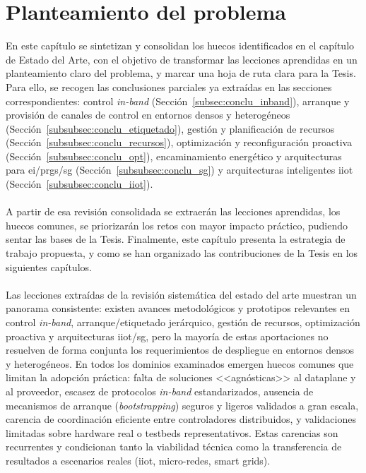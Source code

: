 \chapter{Planteamiento del problema}
\label{ch:problema}

En este capítulo se sintetizan y consolidan los huecos identificados en el capítulo de Estado del Arte, con el objetivo de transformar las lecciones aprendidas en un planteamiento claro del problema, y marcar una hoja de ruta clara para la Tesis. Para ello, se recogen las conclusiones parciales ya extraídas en las secciones correspondientes: control \textit{in-band} (Sección~\ref{subsec:conclu_inband}), arranque y provisión de canales de control en entornos densos y heterogéneos (Sección~\ref{subsubsec:conclu_etiquetado}), gestión y planificación de recursos (Sección~\ref{subsubsec:conclu_recursos}), optimización y reconfiguración proactiva (Sección~\ref{subsubsec:conclu_opt}), encaminamiento energético y arquitecturas para \gls{ei}/\glspl{prg}/\gls{sg} (Sección~\ref{subsubsec:conclu_sg}) y arquitecturas inteligentes \gls{iiot} (Sección~\ref{subsubsec:conclu_iiot}).\\
\\
A partir de esa revisión consolidada se extraerán las lecciones aprendidas, los huecos comunes, se priorizarán los retos con mayor impacto práctico, pudiendo sentar las bases de la Tesis. Finalmente, este capítulo presenta la estrategia de trabajo propuesta, y como se han organizado las contribuciones de la Tesis en los siguientes capítulos.\\
\\
Las lecciones extraídas de la revisión sistemática del estado del arte muestran un panorama consistente: existen avances metodológicos y prototipos relevantes en control \textit{in-band}, arranque/etiquetado jerárquico, gestión de recursos, optimización proactiva y arquitecturas \gls{iiot}/\gls{sg}, pero la mayoría de estas aportaciones no resuelven de forma conjunta los requerimientos de despliegue en entornos densos y heterogéneos. En todos los dominios examinados emergen huecos comunes que limitan la adopción práctica: falta de soluciones <<agnósticas>> al dataplane y al proveedor, escasez de protocolos \textit{in-band} estandarizados, ausencia de mecanismos de arranque (\textit{bootstrapping}) seguros y ligeros validados a gran escala, carencia de coordinación eficiente entre controladores distribuidos, y validaciones limitadas sobre hardware real o testbeds representativos. Estas carencias son recurrentes y condicionan tanto la viabilidad técnica como la transferencia de resultados a escenarios reales (\gls{iiot}, micro-redes, smart grids).\\

